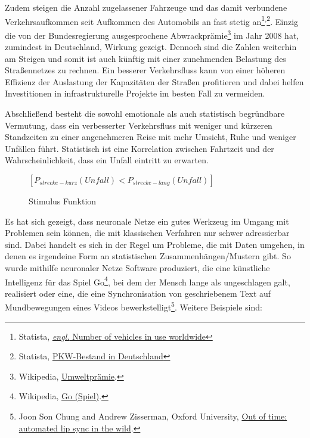 Zudem steigen die Anzahl zugelassener Fahrzeuge und das damit verbundene Verkehrsaufkommen seit Aufkommen des Automobils an fast stetig an\footnote{Statista, \href{https://www.statista.com/statistics/281134/number-of-vehicles-in-use-worldwide/}{\textit{engl.} Number of vehicles in use worldwide}}\textsuperscript{,}\footnote{Statista, \href{https://de.statista.com/statistik/daten/studie/12131/umfrage/pkw-bestand-in-deutschland/}{PKW-Bestand in Deutschland}}. Einzig die von der Bundesregierung ausgesprochene Abwrackprämie\footnote{Wikipedia, \href{https://de.wikipedia.org/wiki/Umweltpr\%C3\%A4mie}{Umweltprämie}.} im Jahr 2008 hat, zumindest in Deutschland, Wirkung gezeigt. Dennoch sind die Zahlen weiterhin am Steigen und somit ist auch künftig mit einer zunehmenden Belastung des Straßennetzes zu rechnen. Ein besserer Verkehrsfluss kann von einer höheren Effizienz der Auslastung der Kapazitäten der Straßen profitieren und dabei helfen Investitionen in infrastrukturelle Projekte im besten Fall zu vermeiden.

Abschließend besteht die sowohl emotionale als auch statistisch begründbare Vermutung, dass ein verbesserter Verkehrsfluss mit weniger und kürzeren Standzeiten zu einer angenehmeren Reise mit mehr Umsicht, Ruhe und weniger Unfällen führt. Statistisch ist eine Korrelation zwischen Fahrtzeit und der Wahrscheinlichkeit, dass ein Unfall eintritt zu erwarten.

\begin{figure}[H]
    \centering
	\( [ P_{strecke-kurz}(Unfall) < P_{strecke-lang}(Unfall) ] \)
    \caption{Stimulus Funktion}
    \label{intro:stimulus_function}
\end{figure}


Es hat sich gezeigt, dass neuronale Netze ein gutes Werkzeug im Umgang mit Problemen sein können, die mit klassischen Verfahren nur schwer adressierbar sind. Dabei handelt es sich in der Regel um Probleme, die mit Daten umgehen, in denen es irgendeine Form an statistischen Zusammenhängen/Mustern gibt. So wurde mithilfe neuronaler Netze Software produziert, die eine künstliche Intelligenz für das Spiel Go\footnote{Wikipedia, \href{https://de.wikipedia.org/wiki/Go\_(Spiel)}{Go (Spiel)}.}, bei dem der Mensch lange als ungeschlagen galt, realisiert oder eine, die eine Synchronisation von geschriebenem Text auf Mundbewegungen eines Videos bewerkstelligt\footnote{Joon Son Chung and Andrew Zisserman, Oxford University, \href{https://www.robots.ox.ac.uk/~vgg/publications/2016/Chung16a/chung16a.pdf}{Out of time: automated lip sync in the wild}.}. Weitere Beispiele sind:

